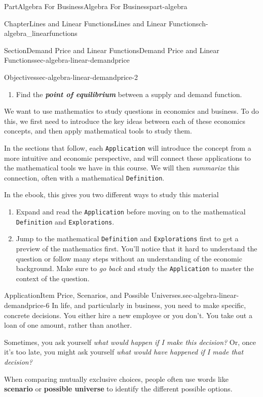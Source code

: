 \documentclass[oneside,10pt,]{tufte-book}
\newcommand{\mono}[1]{\texttt{#1}}
\newcommand{\alert}[1]{\textbf{\textit{#1}}}
\newcommand{\terminology}[1]{\textbf{#1}}
\numberwithin{equation}{chapter}
\begin{document}
\begin{partptx}{Part}{Algebra For Business}{}{Algebra For Business}{}{}{part-algebra}
\begin{chapterptx}{Chapter}{Lines and Linear Functions}{}{Lines and Linear Functions}{}{}{ch-algebra_linearfunctions}
\begin{sectionptx}{Section}{Demand Price and Linear Functions}{}{Demand Price and Linear Functions}{}{}{sec-algebra-linear-demandprice}
\begin{objectives}{Objectives}{sec-algebra-linear-demandprice-2}
\begin{enumerate}
\item{}Find the \alert{point of equilibrium} between a supply and demand function.%
\end{enumerate}
\end{objectives}
We want to use mathematics to study questions in economics and business. To do this, we first need to introduce the key ideas between each of these economics concepts, and then apply mathematical tools to study them.%
\par
In the sections that follow, each \mono{Application} will introduce the concept from a more intuitive and economic perspective, and will connect these applications to the mathematical tools we have in this course. We will then \emph{summarize} this connection, often with a mathematical \mono{Definition}.%
\par
In the ebook, this gives you two different ways to study this material%
\begin{enumerate}
\item{}Expand and read the \mono{Application} before moving on to the mathematical \mono{Definition} and \mono{Explorations}.%
\item{}Jump to the mathematical \mono{Definition} and \mono{Explorations} first to get a preview of the mathematics first. You'll notice that it hard to understand the question or follow many steps without an understanding of the economic background. Make sure to \emph{go back} and study the \mono{Application} to master the context of the question.%
\end{enumerate}
%
\begin{insight}{Application}{Item Price, Scenarios, and Possible Universes.}{sec-algebra-linear-demandprice-6}%
In life, and particularly in business, you need to make specific, concrete decisions. You either hire a new employee or you don't. You take out a loan of one amount, rather than another.%
\par
Sometimes, you ask yourself \emph{what would happen if I make this decision?} Or, once it's too late, you might ask yourself \emph{what would have happened if I made that decision?}%
\par
When comparing mutually exclusive choices, people often use words like \terminology{scenario} or \terminology{possible universe} to identify the different possible options.%
\par

\end{insight}
\end{sectionptx}
\end{chapterptx}
\end{partptx}
\end{document}
